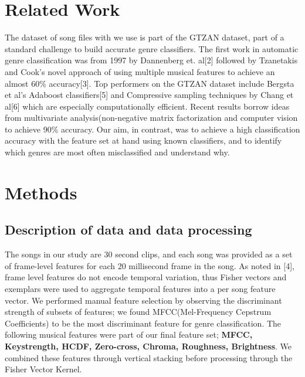 \documentclass{article} %
\begin{document}
\section{Related Work}
The dataset of song files with we use is part of the GTZAN dataset, part of a standard challenge to build accurate genre classifiers. The first work in automatic genre classification was from 1997 by Dannenberg et. al[2] followed by Tzanetakis and Cook's novel approach of using multiple musical features to achieve an almost 60\% accuracy[3]. Top performers on the GTZAN dataset include Bergsta et al's Adaboost classifiers[5] and Compressive sampling techniques by Chang et al[6] which are especially computationally efficient. Recent results borrow ideas from multivariate analysis(non-negative matrix factorization and computer vision to achieve 90\% accuracy. Our aim, in contrast, was to achieve a high classification accuracy with the feature set at hand using known classifiers, and to identify which genres are most often misclassified and understand why.

\section{Methods}
\subsection{Description of data and data processing}
The songs in our study are 30 second clips, and each song was provided as a set of frame-level features for each 20 millisecond frame in the song. As noted in [4], frame level features do not encode temporal variation, thus Fisher vectors and exemplars were used to aggregate temporal features into a per song feature vector. We performed manual feature selection by observing the discriminant strength of subsets of features; we found MFCC(Mel-Frequency Cepstrum Coefficients) to be the most discriminant feature for genre classification. The following musical features were part of our final feature set; \textbf{MFCC, Keystrength, HCDF, Zero-cross, Chroma, Roughness, Brightness}. We combined these features through vertical stacking before processing through the Fisher Vector Kernel.  
\end{document}
